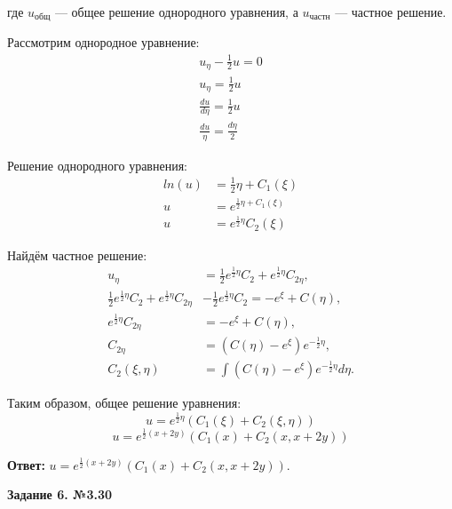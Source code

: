 \documentclass[a4paper,12pt]{article}
\begin{document}
где \( u_{\text{общ}} \) — общее решение однородного уравнения, а \( u_{\text{частн}} \) — частное решение.

Рассмотрим однородное уравнение:
\begin{align*}
     u_{\eta} - \frac{1}{2} u=0 \\
     u_{\eta} =\frac{1}{2} u\\
     \frac{du}{d\eta}=\frac{1}{2}u\\
     \frac{du}{\eta}=\frac{d\eta}{2}
\end{align*}

Решение однородного уравнения:
\begin{equation*}
    \begin{aligned}
     ln(u) &=\frac{1}{2}\eta +C_1(\xi) \\
     u&=e^{\frac{1}{2}\eta +C_1(\xi)} \\
     u&= e^{\frac{1}{2}\eta}C_2(\xi)
    \end{aligned}
\end{equation*}

Найдём частное решение:
\begin{equation*}
    \begin{aligned}
        u_{\eta} &= \frac{1}{2} e^{\frac{1}{2}\eta} C_2 + e^{\frac{1}{2}\eta} C_{2\eta}, \\
        \frac{1}{2} e^{\frac{1}{2}\eta} C_2 + e^{\frac{1}{2}\eta} C_{2\eta} 
        &- \frac{1}{2} e^{\frac{1}{2}\eta} C_2 = - e^{\xi} + C(\eta), \\
        e^{\frac{1}{2}\eta} C_{2\eta} &= - e^{\xi} + C(\eta), \\
        C_{2\eta} &= (C(\eta) - e^{\xi}) e^{-\frac{1}{2}\eta}, \\
        C_2(\xi, \eta) &= \int (C(\eta) - e^{\xi}) e^{-\frac{1}{2}\eta} d\eta.
    \end{aligned}
\end{equation*}

Таким образом, общее решение уравнения:
\begin{equation*}
    u = e^{\frac{1}{2}\eta} ( C_1(\xi) + C_2(\xi, \eta) )
\end{equation*}
\begin{equation*}
     u = e^{\frac{1}{2}(x+2y)} ( C_1(x) + C_2(x, x+2y) )
\end{equation*}

\textbf{Ответ:} $u = e^{\frac{1}{2}(x+2y)} ( C_1(x) + C_2(x, x+2y) ).$

\begin{center}    
    \textbf{Задание 6. №3.30}
\end{center}
\end{document}
